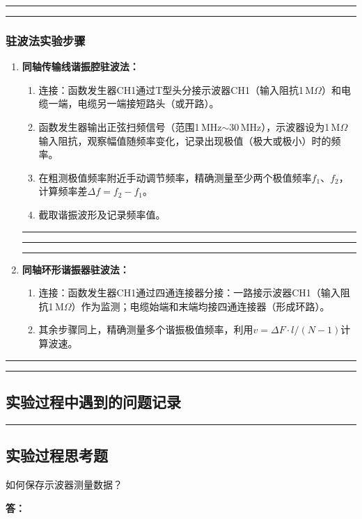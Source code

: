 \documentclass[dvipsnames, svgnames,a4paper,11pt]{article}
\newcommand{\answerblank}[1][3.8cm]{%
  \par\nopagebreak[4]\noindent\textbf{答：}\par\nopagebreak[4]\vspace*{#1}}
\newcommand{\recordblank}[1]{%
  \par\noindent\rule{0.95\linewidth}{0pt}\rule{0pt}{#1}\par}
\begin{document}
\recordblank{6cm}

\recordblank{6cm}

\subsubsection{驻波法实验步骤}
\begin{enumerate}
	\item \textbf{同轴传输线谐振腔驻波法：}
	\begin{enumerate}
		\item 连接：函数发生器CH1通过T型头分接示波器CH1（输入阻抗1\,M$\Omega$）和电缆一端，电缆另一端接短路头（或开路）。
		\item 函数发生器输出正弦扫频信号（范围1\,MHz$\sim$30\,MHz），示波器设为1\,M$\Omega$输入阻抗，观察幅值随频率变化，记录出现极值（极大或极小）时的频率。
		\item 在粗测极值频率附近手动调节频率，精确测量至少两个极值频率$f_1$、$f_2$，计算频率差$\Delta f = f_2 - f_1$。
		\item 截取谐振波形及记录频率值。
	\end{enumerate}

\recordblank{6cm}

\recordblank{5cm}

\recordblank{6cm}

\clearpage

	\item \textbf{同轴环形谐振器驻波法：}
	\begin{enumerate}
		\item 连接：函数发生器CH1通过四通连接器分接：一路接示波器CH1（输入阻抗1\,M$\Omega$）作为监测；电缆始端和末端均接四通连接器（形成环路）。
		\item 其余步骤同上，精确测量多个谐振极值频率，利用$v = \Delta F\cdot l/(N-1)$计算波速。
	\end{enumerate}
\end{enumerate}

\recordblank{5cm}


\recordblank{6cm}

\subsection{实验过程中遇到的问题记录}
\recordblank{5cm}
\subsection{实验过程思考题}
\begin{question}
如何保存示波器测量数据？
\end{question}
\answerblank[3.8cm]
\end{document}
